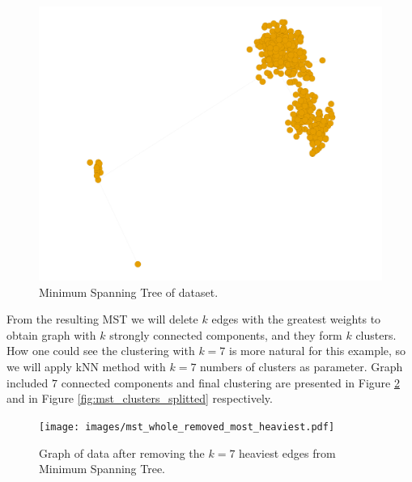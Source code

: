 {{\begin{figure}[h]
	\centering
	\begin{minipage}[h]{0.8\linewidth}
\includegraphics[width=\linewidth]{images/mst_whole.pdf}
	\end{minipage}	
	\caption{Minimum Spanning Tree of dataset.}
	\label{fig:mst_whole}	
\end{figure}	
	
	From the resulting MST we will delete $k$ edges with the greatest weights to obtain graph with $k$ strongly connected components, and they form $k$ clusters. How one could see the clustering with $k=7$ is more natural for this example, so we will apply kNN method with $k = 7$ numbers of clusters as parameter. Graph included $7$ connected components and final clustering are presented in Figure \ref{fig:mst_whole_removed_heaviest} and in Figure \ref{fig:mst_clusters_splitted} respectively.

\begin{figure}[h]
	\centering
	\begin{minipage}[h]{0.8\linewidth}
\texttt{[image: images/mst\_whole\_removed\_most\_heaviest.pdf]}
	\end{minipage}
	\caption{Graph of data after removing the $k=7$ heaviest edges from Minimum Spanning Tree.}
	\label{fig:mst_whole_removed_heaviest}	
\end{figure}	

}}
